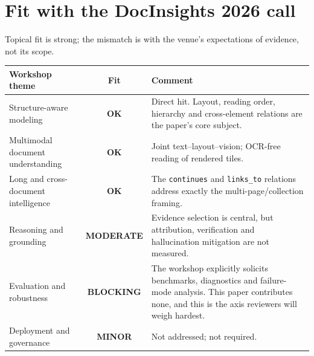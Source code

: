\documentclass[11pt,a4paper]{article}
\newcommand{\blocking}{\textcolor{blockred}{\textbf{BLOCKING}}}
\newcommand{\moderate}{\textcolor{modblue}{\textbf{MODERATE}}}
\newcommand{\minor}{\textcolor{mingray}{\textbf{MINOR}}}
\newcommand{\ok}{\textcolor{okgreen}{\textbf{OK}}}
\begin{document}
\begin{center}
\end{center}

\section{Fit with the DocInsights 2026 call}

Topical fit is strong; the mismatch is with the venue's expectations of evidence, not its scope.

\begin{center}
\begin{tabularx}{\textwidth}{@{}L{5.2cm}cX@{}}
\toprule
\textbf{Workshop theme} & \textbf{Fit} & \textbf{Comment} \\
\midrule
Structure-aware modeling & \ok & Direct hit. Layout, reading order, hierarchy and cross-element relations are the paper's core subject. \\
Multimodal document understanding & \ok & Joint text--layout--vision; OCR-free reading of rendered tiles. \\
Long and cross-document intelligence & \ok & The \texttt{continues} and \texttt{links\_to} relations address exactly the multi-page/collection framing. \\
Reasoning and grounding & \moderate & Evidence selection is central, but attribution, verification and hallucination mitigation are not measured. \\
Evaluation and robustness & \blocking & The workshop explicitly solicits benchmarks, diagnostics and failure-mode analysis. This paper contributes none, and this is the axis reviewers will weigh hardest. \\
Deployment and governance & \minor & Not addressed; not required. \\
\bottomrule
\end{tabularx}
\end{center}
\end{document}
